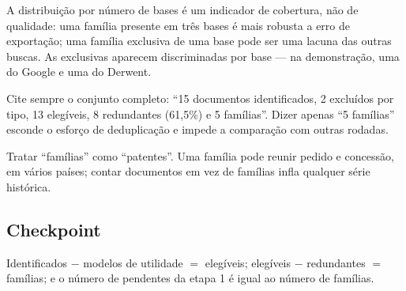 A distribuição por número de bases é um indicador de cobertura, não de qualidade: uma família
presente em três bases é mais robusta a erro de exportação; uma família exclusiva de uma base pode ser
uma lacuna das outras buscas. As exclusivas aparecem discriminadas por base --- na demonstração, uma
do Google e uma do Derwent.

\begin{nota}
Cite sempre o conjunto completo: ``15 documentos identificados, 2 excluídos por tipo, 13 elegíveis,
8 redundantes (61,5\%) e 5 famílias''. Dizer apenas ``5 famílias'' esconde o esforço de deduplicação e
impede a comparação com outras rodadas.
\end{nota}

\begin{alerta}
Tratar ``famílias'' como ``patentes''. Uma família pode reunir pedido e concessão, em vários países;
contar documentos em vez de famílias infla qualquer série histórica.
\end{alerta}

\subsection*{Checkpoint}
\marcador\; Identificados $-$ modelos de utilidade $=$ elegíveis; elegíveis $-$ redundantes $=$ famílias;
e o número de pendentes da etapa 1 é igual ao número de famílias.

